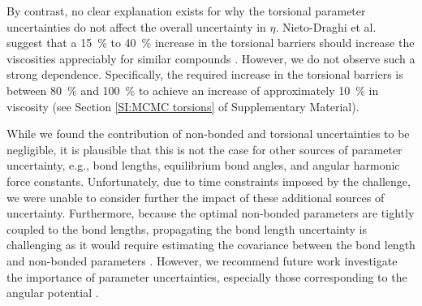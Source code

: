 \documentclass[preprint,review,12pt]{elsarticle}
\begin{document}
    
    By contrast, no clear explanation exists for why the torsional parameter uncertainties do not affect the overall uncertainty in $\eta$. Nieto-Draghi et al. suggest that a 15~\% to 40~\% increase in the torsional barriers should increase the viscosities appreciably for similar compounds \cite{Nieto2006,Nieto2008}. However, we do not observe such a strong dependence. Specifically, the required increase in the torsional barriers is between 80~\% and 100~\% to achieve an increase of approximately 10~\% in viscosity (see Section \ref{SI:MCMC torsions} of Supplementary Material).
    
    
    While we found the contribution of non-bonded and torsional uncertainties to be negligible, it is plausible that this is not the case for other sources of parameter uncertainty, e.g., bond lengths, equilibrium bond angles, and angular harmonic force constants. Unfortunately, due to time constraints imposed by the challenge, we were unable to consider further the impact of these additional sources of uncertainty. Furthermore, because the optimal non-bonded parameters are tightly coupled to the bond lengths, propagating the bond length uncertainty is challenging as it would require estimating the covariance between the bond length and non-bonded parameters \cite{Mess4}. However, we recommend future work investigate the importance of parameter uncertainties, especially those corresponding to the angular potential \cite{Galliero2014}. 
    
    
    
\end{document}
